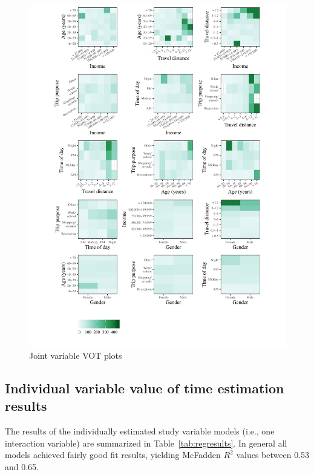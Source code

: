 \documentclass[numbered]{trbunofficial}\usepackage[]{graphicx}\usepackage[]{color}
\begin{document}
\begin{figure}[H]
	\centering
	\includegraphics[width=\textwidth]{localdata/jointplot}
	\caption{Joint variable VOT plots}
	\label{fig:jointplots}
\end{figure}

\subsection{Individual variable value of time estimation results}
The results of the individually estimated study variable models (i.e., one interaction variable) are summarized in Table~\ref{tab:regresults}. In general all models achieved fairly good fit results, yielding McFadden $R^2$ values between 0.53 and 0.65.
\end{document}
